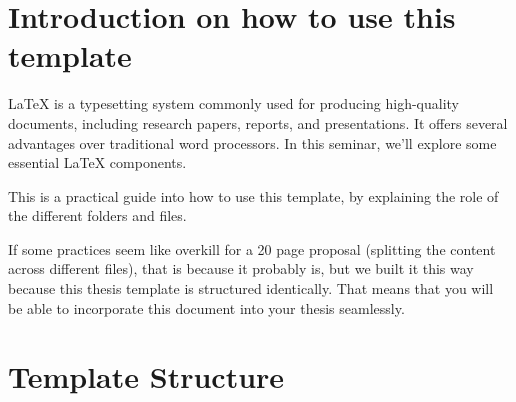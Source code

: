 \section{Introduction on how to use this template}
LaTeX is a typesetting system commonly used for producing high-quality documents, including research papers, reports, and presentations. It offers several advantages over traditional word processors. In this seminar, we'll explore some essential LaTeX components.

This is a practical guide into how to use this template, by explaining the role of the different folders and files.

If some practices seem like overkill for a 20 page proposal (splitting the content across different files), that is because it probably is, but we built it this way because this thesis template is structured identically. That means that you will be able to incorporate this document into your thesis seamlessly.

\section{Template Structure}



